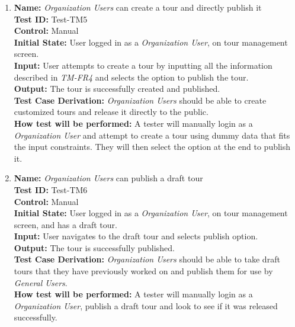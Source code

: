 \documentclass[12pt, titlepage]{article}
\begin{document}
\begin{enumerate}
  \item
        \textbf{Name:} \textit{Organization Users} can create a tour and directly publish it \label{itm:Test-TM5} \\
        \textbf{Test ID:} Test-TM5 \\
        \textbf{Control:} Manual \\
        \textbf{Initial State:} User logged in as a \textit{Organization User}, on tour management screen. \\
        \textbf{Input:} User attempts to create a tour by inputting all the information described in \textit{TM-FR4} and selects the option to publish the tour. \\
        \textbf{Output:} The tour is successfully created and published. \\
        \textbf{Test Case Derivation:} \textit{Organization Users} should be able to create customized tours and release it directly to the public. \\
        \textbf{How test will be performed:} A tester will manually login as a \textit{Organization User} and attempt to create a tour using dummy data that fits the input constraints. They will then select the option at the end to publish it.

  \item
        \textbf{Name:} \textit{Organization Users} can publish a draft tour \label{itm:Test-TM6} \\
        \textbf{Test ID:} Test-TM6 \\
        \textbf{Control:} Manual \\
        \textbf{Initial State:} User logged in as a \textit{Organization User}, on tour management screen, and has a draft tour. \\
        \textbf{Input:} User navigates to the draft tour and selects publish option. \\
        \textbf{Output:} The tour is successfully published. \\
        \textbf{Test Case Derivation:} \textit{Organization Users} should be able to take draft tours that they have previously worked on and publish them for use by \textit{General Users}. \\
        \textbf{How test will be performed:} A tester will manually login as a \textit{Organization User}, publish a draft tour and look to see if it was released successfully.


\end{enumerate}
\end{document}
